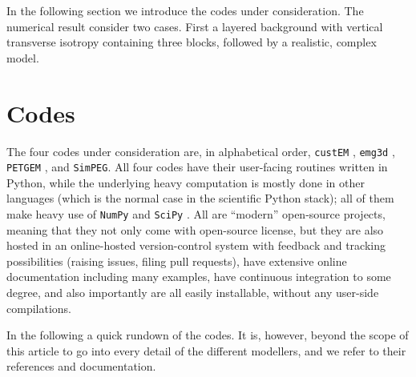 \documentclass[
    paper,
  ]{geophysics}
\newcommand{\emg}[2]{\texttt{emg#1#2}\xspace}
\newcommand{\simpeg}{\texttt{SimPEG}\xspace}
\newcommand{\custem}{\texttt{custEM}\xspace}
\newcommand{\petgem}{\texttt{PETGEM}\xspace}
\begin{document}
In the following section we introduce the codes under consideration. The
numerical result consider two cases. First a layered background with vertical
transverse isotropy containing three blocks, followed by a realistic, complex
model.

\clearpage  %
\section{Codes}

The four codes under consideration are, in alphabetical order, \custem
\citep{GEO.19.Rochlitz}, \emg3d \citep{JOSS.19.Werthmuller}, \petgem
\citep{GJI.19.CastilloReyes}, and \simpeg \citep{CAG.15.Cockett}. All four
codes have their user-facing routines written in Python, while the underlying
heavy computation is mostly done in other languages (which is the normal case
in the scientific Python stack); all of them make heavy use of \texttt{NumPy}
\citep{CSE.11.VanDerWalt} and \texttt{SciPy} \citep{NM.20.Virtanen}. All are
“modern” open-source projects, meaning that they not only come with open-source
license, but they are also hosted in an online-hosted version-control system
with feedback and tracking possibilities (raising issues, filing pull
requests), have extensive online documentation including many examples, have
continuous integration to some degree, and also importantly are all easily
installable, without any user-side compilations.

In the following a quick rundown of the codes. It is, however, beyond the scope
of this article to go into every detail of the different modellers, and we
refer to their references and documentation.
\end{document}
